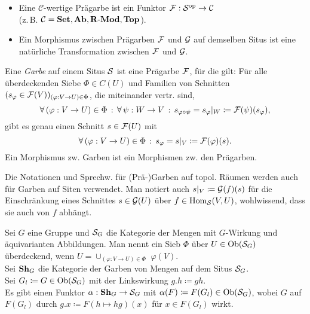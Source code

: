 \documentclass{cheat-sheet}
\begin{document}
\begin{defn}
  \begin{itemize}
    \item Eine $\mathcal{C}$-wertige Prägarbe ist ein Funktor $\mathcal{F} : \mathcal{S}^{\mathrm{op}} \to \mathcal{C}$ \\
    (z.\,B. $\mathcal{C} = \mathbf{Set}, \mathbf{Ab}, \mathbf{R\text{-}Mod}, \mathbf{Top}$).
    \item Ein Morphismus zwischen Prägarben $\mathcal{F}$ und $\mathcal{G}$ auf demselben Situs ist eine natürliche Transformation zwischen $\mathcal{F}$ und $\mathcal{G}$.
  \end{itemize}
\end{defn}

\begin{defn}
  Eine \emph{Garbe} auf einem Situs $\mathcal{S}$ ist eine Prägarbe $\mathcal{F}$, für die gilt:
  Für alle überdeckenden Siebe $\Phi \in C(U)$ und Familien von Schnitten $(s_\varphi \in \mathcal{F}(V))_{(\varphi : V \to U) \in \Phi}$, die miteinander vertr. sind, \dh{}
  \[ \forall \, {(\varphi : V \to U) \in \Phi} \,:\, \forall \, {\psi : W \to V} \,:\, s_{\varphi \circ \psi} = s_\varphi|_W \coloneqq \mathcal{F}(\psi)(s_\varphi), \]
  gibt es genau einen Schnitt $s \in \mathcal{F}(U)$ mit
  \[ \forall \, {(\varphi : V \to U) \in \Phi} \,:\, s_\varphi = s|_V \coloneqq \mathcal{F}(\varphi)(s). \]
  Ein Morphismus zw. Garben ist ein Morphismen zw. den Prägarben.
\end{defn}

\begin{bem}
  Die Notationen und Sprechw. für (Prä-)Garben auf topol. Räumen werden auch für Garben auf Siten verwendet.
  Man notiert auch $s|_V \coloneqq \mathcal{G}(f)(s)$ für die Einschränkung eines Schnittes $s \in \mathcal{G}(U)$ über $f \in \operatorname{Hom}_{\mathcal{S}}(V, U)$, wohlwissend, dass sie auch von $f$ abhängt.
\end{bem}

\begin{bsp}
  Sei $G$ eine Gruppe und $\mathcal{S}_G$ die Kategorie der Mengen mit $G$-Wirkung und äquivarianten Abbildungen. Man nennt ein Sieb $\Phi$ über $U \in \operatorname{Ob}(\mathcal{S}_G)$ überdeckend, wenn
  $U = \cup_{(\varphi : V \to U) \in \Phi} \,\, \varphi(V)$. \\
  Sei $\mathbf{Sh}_G$ die Kategorie der Garben von Mengen auf dem Situs $\mathcal{S}_G$. \\
  Sei $G_l \coloneqq G \in \operatorname{Ob}(\mathcal{S}_G)$ mit der Linkswirkung $g.h \coloneqq gh$. \\
  Es gibt einen Funktor $\alpha : \mathbf{Sh}_G \to \mathcal{S}_G$ mit $\alpha(F) \coloneqq F(G_l) \in \operatorname{Ob}(\mathcal{S}_G)$, wobei $G$ auf $F(G_l)$ durch $g.x \coloneqq F(h \mapsto hg)(x)$ für $x \in F(G_l)$ wirkt.
\end{bsp}
\end{document}

